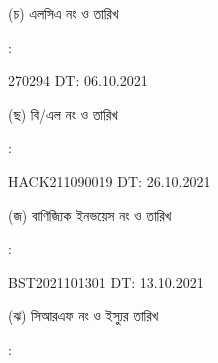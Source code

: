 \documentclass[12pt]{article}
\newcommand{\blno}{HACK211090019}
\newcommand{\bldt}{26.10.2021}
\newcommand{\lcano}{270294}
\newcommand{\lcadt}{06.10.2021}
\newcommand{\invno}{BST2021101301}
\newcommand{\invdt}{13.10.2021}
\begin{document}
\begin{minipage}[t]{0.05\linewidth}
\hspace*{1em}
\end{minipage}
\begin{minipage}[t]{0.45\linewidth}
(চ) এলসিএ নং ও তারিখ
\end{minipage}
\begin{minipage}[t]{0.02\linewidth}
:
\end{minipage}
\begin{minipage}[t]{0.50\linewidth}
{\lcano} \hspace{2em} DT: {\lcadt}
\\
\end{minipage}
\begin{minipage}[t]{0.05\linewidth}
\hspace*{1em}
\end{minipage}
\begin{minipage}[t]{0.45\linewidth}
(ছ) বি/এল নং ও তারিখ
\end{minipage}
\begin{minipage}[t]{0.02\linewidth}
:
\end{minipage}
\begin{minipage}[t]{0.50\linewidth}
{\blno} \hspace{2em} DT: {\bldt}
\\
\end{minipage}
\begin{minipage}[t]{0.05\linewidth}
\hspace*{1em}
\end{minipage}
\begin{minipage}[t]{0.45\linewidth}
(জ) বাণিজ্যিক ইনভয়েস নং ও তারিখ
\end{minipage}
\begin{minipage}[t]{0.02\linewidth}
:
\end{minipage}
\begin{minipage}[t]{0.50\linewidth}
{\invno} \hspace{2em} DT: {\invdt}
\\
\end{minipage}
\begin{minipage}[t]{0.05\linewidth}
\hspace*{1em}
\end{minipage}
\begin{minipage}[t]{0.45\linewidth}
(ঝ) সিআরএফ নং ও ইস্যুর তারিখ
\end{minipage}
\begin{minipage}[t]{0.02\linewidth}
:
\end{minipage}
\end{document}

